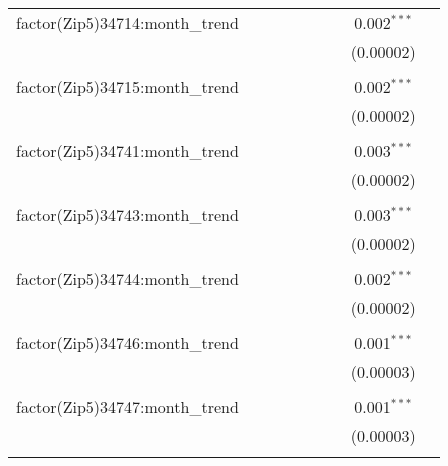 \begin{table}[H]
{\begin{tabular}{@{\extracolsep{5pt}}lcccccccc}
  factor(Zip5)34714:month\_trend &  &  &  &  &  &  & 0.002$^{***}$ &  \\  

   &  &  &  &  &  &  & (0.00002) &  \\  

   & & & & & & & & \\  

  factor(Zip5)34715:month\_trend &  &  &  &  &  &  & 0.002$^{***}$ &  \\  

   &  &  &  &  &  &  & (0.00002) &  \\  

   & & & & & & & & \\  

  factor(Zip5)34741:month\_trend &  &  &  &  &  &  & 0.003$^{***}$ &  \\  

   &  &  &  &  &  &  & (0.00002) &  \\  

   & & & & & & & & \\  

  factor(Zip5)34743:month\_trend &  &  &  &  &  &  & 0.003$^{***}$ &  \\  

   &  &  &  &  &  &  & (0.00002) &  \\  

   & & & & & & & & \\  

  factor(Zip5)34744:month\_trend &  &  &  &  &  &  & 0.002$^{***}$ &  \\  

   &  &  &  &  &  &  & (0.00002) &  \\  

   & & & & & & & & \\  

  factor(Zip5)34746:month\_trend &  &  &  &  &  &  & 0.001$^{***}$ &  \\  

   &  &  &  &  &  &  & (0.00003) &  \\  

   & & & & & & & & \\  

  factor(Zip5)34747:month\_trend &  &  &  &  &  &  & 0.001$^{***}$ &  \\  

   &  &  &  &  &  &  & (0.00003) &  \\  

   & & & & & & & & \\  


\end{tabular}}
\end{table}
